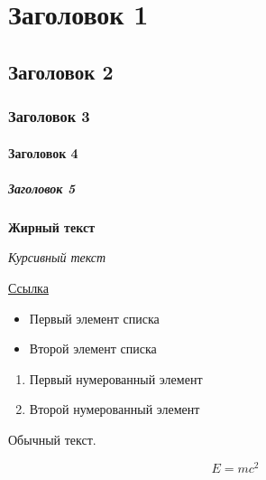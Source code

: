 \section{Заголовок 1}

\subsection{Заголовок 2}

\subsubsection{Заголовок 3}

\paragraph{Заголовок 4}

\subparagraph{Заголовок 5}


\textbf{Жирный текст}

\textit{Курсивный текст}

\href{https://example.com}{Ссылка}

\begin{itemize}
\item Первый элемент списка
\item Второй элемент списка
\end{itemize}

\begin{enumerate}
\item Первый нумерованный элемент
\item Второй нумерованный элемент
\end{enumerate}

Обычный текст.

$$
E = mc^2
$$